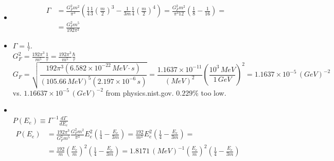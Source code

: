 \documentclass[twoside]{amsart}
\begin{document}
\begin{itemize}
\[
\begin{aligned}
  \xrightarrow{ k_{1\mu}k_{3\nu}' } & \frac{1}{96 \pi} ((-m^2 - 2k_1 k_{3'}) k_{1\mu} k_{3'}^{\mu} + 2(-m^2 -k_1 k_{3'} )(k_1 k_{3'} - 0 )) = \\
  & = \frac{1}{96 \pi} ( - m^2 k_1 k_{3'} - 2(k_1 k_{3'} )^2 + -2m^2 k_1 k_{3'} - 2(k_1 k_{3'})^2 ) =  \\
  & = \frac{-k_1 k_{3'}}{ 96 \pi} (3m^2 + 4(k_1 k_{3'}) )
\end{aligned}
\]
Now $k_1 k_{3'} = -m E_e$.  

\[
\Longrightarrow \frac{ mE_e}{96 \pi} (3m^2 + - 4m E_e) = \frac{ m^3 E_e}{32 \pi} \left( 1 - \frac{4}{3} \frac{E_e}{m} \right)
\]
\[
\begin{aligned}
  \Gamma & = \frac{32 G_F^2}{m} \int \frac{ E_{3'}^2 dE_{3'} d\Omega_{3'} }{ (2\pi)^3 2 E_{3'}} \frac{ m^3 E_e}{32 \pi} \left( 1 - \frac{4}{3} \frac{E_e}{m} \right) = \\ 
  & = \frac{ G_F^2 m^2 }{(2\pi)^2 \pi } \int E_e^2 \left( 1 - \frac{4}{3} \frac{E_e}{m} \right) dE_e = \frac{ G_F^2 m^2 }{ \pi^3} \int E_e^2 \left( \frac{1}{4} - \frac{E_e}{3m } \right) dE_e
\end{aligned}
\]
\[
\boxed{ \frac{d\Gamma}{dE_e}   = \frac{ G_F^2 m^2 }{ \pi^3} E_e^2 \left( \frac{1}{4} - \frac{E_e}{3m } \right) }
\]
\item[(f)] \[
\begin{aligned}
  \Gamma & = \frac{G_F^2 m^2 }{ \pi^3} \left( \frac{1}{4} \frac{1}{3} \left( \frac{m}{2} \right)^3 - \frac{1}{3m} \frac{1}{4} \left( \frac{m}{2} \right)^4 \right) = \frac{ G_F^2 m^2 }{ \pi^3 12} \left( \frac{1}{8} - \frac{1}{16} \right)  = \\
  & = \boxed{ \frac{ G_F^2 m^5}{ 192 \pi^3 } }
\end{aligned}
\]
\item[(g)] $\Gamma = \frac{1}{\tau}$.  \\
$G_F^2 = \frac{192 \pi^3}{m^5} \frac{1}{\tau} = \frac{ 192 \pi^3}{m^5} \frac{\hbar}{\tau}$
\[
G_F = \sqrt{ \frac{ 192 \pi^3 (6.582 \times 10^{-22} \, MeV\cdot s ) }{ (105.66 \, MeV)^5 (2.197 \times 10^{-6} \, s ) } } = \frac{ 1.1637 \times 10^{-11}}{ (MeV)^2} \left( \frac{ 10^3 \, MeV}{ 1 \, GeV} \right)^2 = \boxed{ 1.1637 \times 10^{-5} \, (GeV)^{-2} }
\]
vs. $1.16637 \times 10^{-5} \, (GeV)^{-2}$ from physics.nist.gov.  $0.229 \%$ too low.  
\item[(h)] \quad \\
$P(E_e) \equiv \Gamma^{-1} \frac{d\Gamma}{dE_e}$ \\
$\begin{aligned} P(E_e) & = \frac{ 192 \pi^3}{ G_F^2 m^5} \frac{G_F^2 m^2 }{\pi^3} E_e^2 \left( \frac{1}{4} - \frac{E_e}{3m} \right) = \frac{192}{m^3} E_e^2 \left( \frac{1}{4} - \frac{E_e}{3m} \right) = \\
  & = \frac{192}{m} \left( \frac{E_e}{m} \right)^2 \left( \frac{1}{4} - \frac{E_e}{3m} \right) = 1.8171 \, (MeV)^{-1} \left( \frac{E_e}{m} \right)^2 \left( \frac{1}{4} - \frac{E_e}{3m} \right)
\end{aligned}$



\end{itemize}
\end{document}
